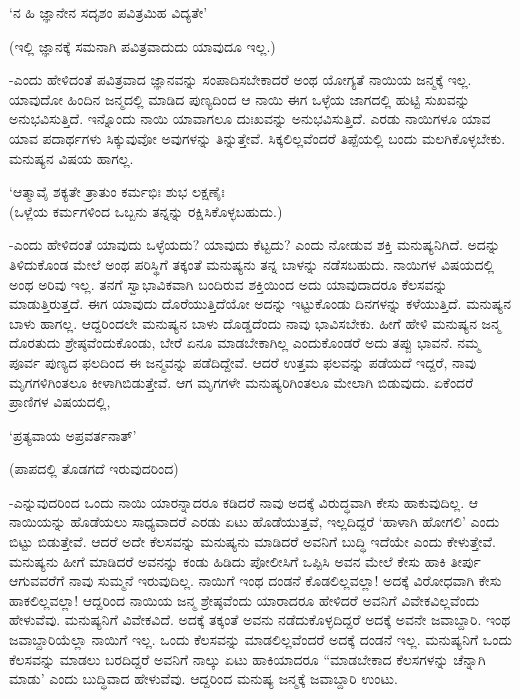 \begin{shloka}
`ನ ಹಿ ಜ್ಞಾನೇನ ಸದೃಶಂ ಪವಿತ್ರಮಿಹ ವಿದ್ಯತೇ'
\end{shloka}

(ಇಲ್ಲಿ ಜ್ಞಾನಕ್ಕೆ ಸಮನಾಗಿ ಪವಿತ್ರವಾದುದು ಯಾವುದೂ ಇಲ್ಲ.)

-ಎಂದು ಹೇಳಿದಂತೆ ಪವಿತ್ರವಾದ ಜ್ಞಾನವನ್ನು ಸಂಪಾದಿಸಬೇಕಾದರೆ ಅಂಥ ಯೋಗ್ಯತೆ ನಾಯಿಯ ಜನ್ಮಕ್ಕೆ ಇಲ್ಲ. ಯಾವುದೋ ಹಿಂದಿನ ಜನ್ಮದಲ್ಲಿ ಮಾಡಿದ ಪುಣ್ಯದಿಂದ ಆ ನಾಯಿ ಈಗ ಒಳ್ಳೆಯ ಜಾಗದಲ್ಲಿ ಹುಟ್ಟಿ ಸುಖವನ್ನು ಅನುಭವಿಸುತ್ತಿದೆ. ಇನ್ನೊಂದು ನಾಯಿ ಯಾವಾಗಲೂ ದುಃಖವನ್ನು ಅನುಭವಿಸುತ್ತಿದೆ. ಎರಡು ನಾಯಿಗಳೂ ಯಾವ ಯಾವ ಪದಾರ್ಥಗಳು ಸಿಕ್ಕುವುವೋ ಅವುಗಳನ್ನು ತಿನ್ನುತ್ತೇವೆ. ಸಿಕ್ಕಲಿಲ್ಲವೆಂದರೆ ತಿಪ್ಪೆಯಲ್ಲಿ ಬಂದು ಮಲಗಿಕೊಳ್ಳಬೇಕು. ಮನುಷ್ಯನ ವಿಷಯ ಹಾಗಲ್ಲ.

\begin{shloka}
`ಆತ್ಮಾವೈ ಶಕ್ಯತೇ ತ್ರಾತುಂ ಕರ್ಮಭಿಃ ಶುಭ ಲಕ್ಷಣೈಃ\\
(ಒಳ್ಲೆಯ ಕರ್ಮಗಳಿಂದ ಒಬ್ಬನು ತನ್ನನ್ನು ರಕ್ಷಿಸಿಕೊಳ್ಳಬಹುದು.)
\end{shloka}

-ಎಂದು ಹೇಳಿದಂತೆ ಯಾವುದು ಒಳ್ಳೆಯದು? ಯಾವುದು ಕೆಟ್ಟದು? ಎಂದು ನೋಡುವ ಶಕ್ತಿ ಮನುಷ್ಯನಿಗಿದೆ. ಅದನ್ನು ತಿಳಿದುಕೊಂಡ ಮೇಲೆ ಅಂಥ ಪರಿಸ್ಥಿಗೆ ತಕ್ಕಂತೆ ಮನುಷ್ಯನು ತನ್ನ ಬಾಳನ್ನು ನಡೆಸಬಹುದು. ನಾಯಿಗಳ ವಿಷಯದಲ್ಲಿ ಅಂಥ ಅರಿವು ಇಲ್ಲ. ತನಗೆ ಸ್ವಾಭಾವಿಕವಾಗಿ ಬಂದಿರುವ ಶಕ್ತಿಯಿಂದ ಅದು ಯಾವುದಾದರೂ ಕೆಲಸವನ್ನು ಮಾಡುತ್ತಿರುತ್ತದೆ. ಈಗ ಯಾವುದು ದೊರೆಯುತ್ತಿದೆಯೋ ಅದನ್ನು ಇಟ್ಟುಕೊಂಡು ದಿನಗಳನ್ನು ಕಳೆಯುತ್ತಿದೆ. ಮನುಷ್ಯನ ಬಾಳು ಹಾಗಲ್ಲ. ಆದ್ದರಿಂದಲೇ ಮನುಷ್ಯನ ಬಾಳು ದೊಡ್ಡದೆಂದು ನಾವು ಭಾವಿಸಬೇಕು. ಹೀಗೆ ಹೇಳಿ ಮನುಷ್ಯನ ಜನ್ಮ ದೊರತುದು ಶ್ರೇಷ್ಠವೆಂದುಕೊಂಡು, ಬೇರೆ ಏನೂ ಮಾಡಬೇಕಾಗಿಲ್ಲ ಎಂದುಕೊಂಡರೆ ಅದು ತಪ್ಪು ಭಾವನೆ. ನಮ್ಮ ಪೂರ್ವ ಪುಣ್ಯದ ಫಲದಿಂದ ಈ ಜನ್ಮವನ್ನು ಪಡೆದಿದ್ದೇವೆ. ಆದರೆ ಉತ್ತಮ ಫಲವನ್ನು ಪಡೆಯದೆ ಇದ್ದರೆ, ನಾವು ಮೃಗಗಳಿಗಿಂತಲೂ ಕೀಳಾಗಿಬಿಡುತ್ತೇವೆ. ಆಗ ಮೃಗಗಳೇ ಮನುಷ್ಯರಿಗಿಂತಲೂ ಮೇಲಾಗಿ ಬಿಡುವುದು. ಏಕೆಂದರೆ ಪ್ರಾಣಿಗಳ ವಿಷಯದಲ್ಲಿ,

\begin{shloka}
`ಪ್ರತ್ಯವಾಯ ಅಪ್ರವರ್ತನಾತ್'
\end{shloka}

(ಪಾಪದಲ್ಲಿ ತೊಡಗದೆ ಇರುವುದರಿಂದ)

-ಎನ್ನುವುದರಿಂದ ಒಂದು ನಾಯಿ ಯಾರನ್ನಾದರೂ ಕಡಿದರೆ ನಾವು ಅದಕ್ಕೆ ವಿರುದ್ಧವಾಗಿ ಕೇಸು ಹಾಕುವುದಿಲ್ಲ. ಆ ನಾಯಿಯನ್ನು ಹೊಡೆಯಲು ಸಾಧ್ಯವಾದರೆ ಎರಡು ಏಟು ಹೊಡೆಯುತ್ತವೆ, ಇಲ್ಲದಿದ್ದರೆ `ಹಾಳಾಗಿ ಹೋಗಲಿ' ಎಂದು ಬಿಟ್ಟು ಬಿಡುತ್ತೇವೆ. ಆದರೆ ಅದೇ ಕೆಲಸವನ್ನು ಮನುಷ್ಯನು ಮಾಡಿದರೆ ಅವನಿಗೆ ಬುದ್ಧಿ ಇದೆಯೇ ಎಂದು ಕೇಳುತ್ತೇವೆ. ಮನುಷ್ಯನು ಹೀಗೆ ಮಾಡಿದರೆ ಅವನನ್ನು ಕಂಡು ಹಿಡಿದು ಪೋಲೀಸಿಗೆ ಒಪ್ಪಿಸಿ ಅವನ ಮೇಲೆ ಕೇಸು ಹಾಕಿ ತೀರ್ಪು ಆಗುವವರೆಗೆ ನಾವು ಸುಮ್ಮನೆ ಇರುವುದಿಲ್ಲ. ನಾಯಿಗೆ ಇಂಥ ದಂಡನೆ ಕೊಡಲಿಲ್ಲವಲ್ಲಾ! ಅದಕ್ಕೆ ವಿರೋಧವಾಗಿ ಕೇಸು ಹಾಕಲಿಲ್ಲವಲ್ಲಾ! ಆದ್ದರಿಂದ ನಾಯಿಯ ಜನ್ಮ ಶ್ರೇಷ್ಠವೆಂದು ಯಾರಾದರೂ ಹೇಳಿದರೆ ಅವನಿಗೆ ವಿವೇಕವಿಲ್ಲವೆಂದು ಹೇಳುವೆವು. ಮನುಷ್ಯನಿಗೆ ವಿವೇಕವಿದೆ. ಅದಕ್ಕೆ ತಕ್ಕಂತೆ ಅವನು ನಡೆದುಕೊಳ್ಳದಿದ್ದರೆ ಅದಕ್ಕೆ ಅವನೇ ಜವಾಬ್ದಾರಿ. ಇಂಥ ಜವಾಬ್ದಾರಿಯೆಲ್ಲಾ ನಾಯಿಗೆ ಇಲ್ಲ. ಒಂದು ಕೆಲಸವನ್ನು ಮಾಡಲಿಲ್ಲವೆಂದರೆ ಅದಕ್ಕೆ ದಂಡನೆ ಇಲ್ಲ. ಮನುಷ್ಯನಿಗೆ ಒಂದು ಕೆಲಸವನ್ನು ಮಾಡಲು ಬರದಿದ್ದರೆ ಅವನಿಗೆ ನಾಲ್ಕು ಏಟು ಹಾಕಿಯಾದರೂ ``ಮಾಡಬೇಕಾದ ಕೆಲಸಗಳನ್ನು ಚೆನ್ನಾಗಿ ಮಾಡು' ಎಂದು ಬುದ್ಧಿವಾದ ಹೇಳುವೆವು. ಆದ್ದರಿಂದ ಮನುಷ್ಯ ಜನ್ಮಕ್ಕೆ ಜವಾಬ್ದಾರಿ ಉಂಟು.

